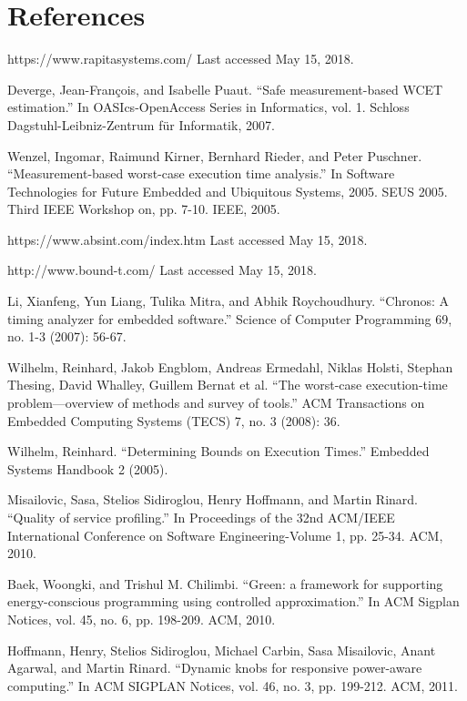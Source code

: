 \section{References}

\begin{thebibliography}{}
  https://www.rapitasystems.com/
  Last accessed May 15, 2018.
 
  Deverge, Jean-François, and Isabelle Puaut. ``Safe measurement-based WCET estimation.'' In OASIcs-OpenAccess Series in Informatics, vol. 1. Schloss Dagstuhl-Leibniz-Zentrum für Informatik, 2007.  

  Wenzel, Ingomar, Raimund Kirner, Bernhard Rieder, and Peter Puschner. ``Measurement-based worst-case execution time analysis.'' In Software Technologies for Future Embedded and Ubiquitous Systems, 2005. SEUS 2005. Third IEEE Workshop on, pp. 7-10. IEEE, 2005.
  
  https://www.absint.com/index.htm
  Last accessed May 15, 2018.

  http://www.bound-t.com/
  Last accessed May 15, 2018.
  
  Li, Xianfeng, Yun Liang, Tulika Mitra, and Abhik Roychoudhury. ``Chronos: A timing analyzer for embedded software.'' Science of Computer Programming 69, no. 1-3 (2007): 56-67.

  Wilhelm, Reinhard, Jakob Engblom, Andreas Ermedahl, Niklas Holsti, Stephan Thesing, David Whalley, Guillem Bernat et al. ``The worst-case execution-time problem—overview of methods and survey of tools.'' ACM Transactions on Embedded Computing Systems (TECS) 7, no. 3 (2008): 36.
  
  Wilhelm, Reinhard. ``Determining Bounds on Execution Times.'' Embedded Systems Handbook 2 (2005).

  Misailovic, Sasa, Stelios Sidiroglou, Henry Hoffmann, and Martin Rinard. ``Quality of service profiling.'' In Proceedings of the 32nd ACM/IEEE International Conference on Software Engineering-Volume 1, pp. 25-34. ACM, 2010.

  Baek, Woongki, and Trishul M. Chilimbi. ``Green: a framework for supporting energy-conscious programming using controlled approximation.'' In ACM Sigplan Notices, vol. 45, no. 6, pp. 198-209. ACM, 2010.

  Hoffmann, Henry, Stelios Sidiroglou, Michael Carbin, Sasa Misailovic, Anant Agarwal, and Martin Rinard. ``Dynamic knobs for responsive power-aware computing.'' In ACM SIGPLAN Notices, vol. 46, no. 3, pp. 199-212. ACM, 2011.


\end{thebibliography}
